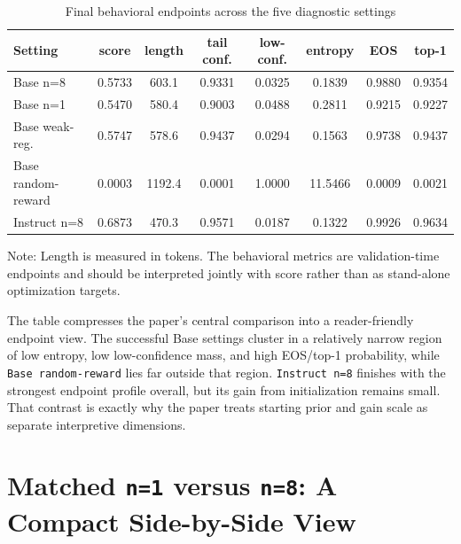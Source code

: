 \documentclass[12pt,a4paper]{ctexart}
\begin{document}
\begin{table}[H]
    \centering
    \caption{Final behavioral endpoints across the five diagnostic settings}
    \label{tab:en-appendix-endpoints}
    \scriptsize
    \setlength{\tabcolsep}{3.2pt}
    \renewcommand{\arraystretch}{1.15}
    \begin{threeparttable}
    \begin{tabular}{lccccccc}
        \toprule
        Setting & score & length & tail conf. & low-conf. & entropy & EOS & top-1 \\
        \midrule
        Base n=8 & 0.5733 & 603.1 & 0.9331 & 0.0325 & 0.1839 & 0.9880 & 0.9354 \\
        Base n=1 & 0.5470 & 580.4 & 0.9003 & 0.0488 & 0.2811 & 0.9215 & 0.9227 \\
        Base weak-reg. & 0.5747 & 578.6 & 0.9437 & 0.0294 & 0.1563 & 0.9738 & 0.9437 \\
        Base random-reward & 0.0003 & 1192.4 & 0.0001 & 1.0000 & 11.5466 & 0.0009 & 0.0021 \\
        Instruct n=8 & 0.6873 & 470.3 & 0.9571 & 0.0187 & 0.1322 & 0.9926 & 0.9634 \\
        \bottomrule
    \end{tabular}
    \begin{tablenotes}[flushleft]
        \footnotesize
        \item Note: Length is measured in tokens. The behavioral metrics are validation-time endpoints and should be interpreted jointly with score rather than as stand-alone optimization targets.
    \end{tablenotes}
    \end{threeparttable}
\end{table}

The table compresses the paper's central comparison into a reader-friendly endpoint view. The successful Base settings cluster in a relatively narrow region of low entropy, low low-confidence mass, and high EOS/top-1 probability, while \texttt{Base random-reward} lies far outside that region. \texttt{Instruct n=8} finishes with the strongest endpoint profile overall, but its gain from initialization remains small. That contrast is exactly why the paper treats starting prior and gain scale as separate interpretive dimensions.

\clearpage
\section{Matched \texttt{n=1} versus \texttt{n=8}: A Compact Side-by-Side View}
\end{document}

